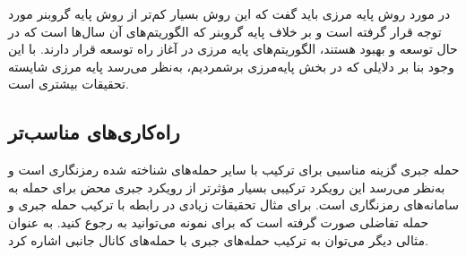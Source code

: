 در مورد روش پایه مرزی باید گفت که این روش بسیار کم‌تر از روش پایه گروبنر مورد توجه قرار گرفته است و بر خلاف پایه گروبنر که الگوریتم‌های آن سال‌ها است  که در حال توسعه و بهبود هستند، الگوریتم‌های پایه مرزی در آغاز راه توسعه قرار دارند. با این وجود  بنا بر دلایلی که در بخش پایه‌مرزی برشمردیم، به‌نظر می‌رسد پایه مرزی شایسته تحقیقات بیشتری است. 
\subsection{راه‌کاری‌های مناسب‌تر}
حمله جبری گزینه مناسبی برای ترکیب با سایر حمله‌های شناخته شده رمزنگاری است و به‌نظر می‌رسد این رویکرد ترکیبی بسیار مؤثر‌تر از رویکرد جبری  محض  برای حمله به سامانه‌های رمزنگاری است. برای مثال تحقیقات زیادی در رابطه با ترکیب حمله جبری و حمله تفاضلی صورت گرفته است  که برای نمونه می‌توانید به 
\cite{cryptoeprint:2008:177} 
رجوع کنید.  به عنوان مثالی دیگر می‌توان به ترکیب حمله‌های جبری با حمله‌های کانال جانبی اشاره کرد. 












